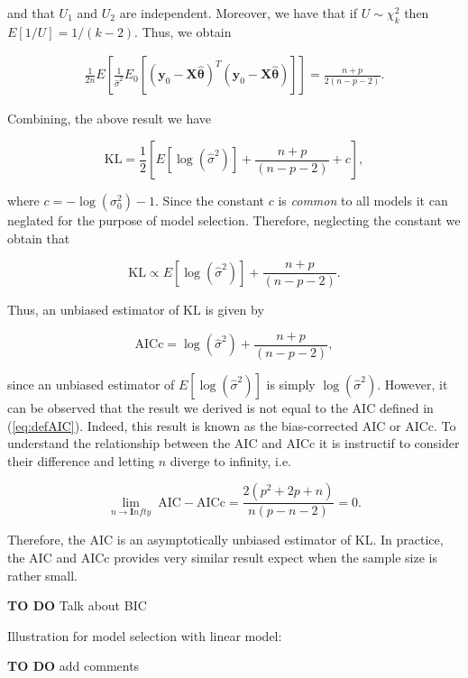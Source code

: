 \documentclass[]{book}
\theoremstyle{definition}
\theoremstyle{definition}
\theoremstyle{definition}
\theoremstyle{remark}
\begin{document}
{and that \(U_1\) and \(U_2\) are independent. Moreover, we have that if
\(U \sim \chi^2_k\) then \(E[1/U] = 1/(k-2)\). Thus, we obtain

\[\begin{aligned}
\frac{1}{{2n}} {E}\left[ \frac{1}{\hat{\sigma}^2} {E_0}\left[ {{{\left( {\mathbf{y}_0 - \mathbf{X}{\hat{\boldsymbol{\theta}}}} \right)}^T}\left( {\mathbf{y}_0 - \mathbf{X}\hat{\boldsymbol{\theta}}} \right)} \right]\right]
   = \frac{n+p}{{2(n-p-2)}}.
\end{aligned}\]

Combining, the above result we have

\[\text{KL} = \frac{1}{2} \left[ E \left[ \log \left( \hat{\sigma}^2 \right) \right] + \frac{n+p}{(n-p-2)} + c \right],\]

where \(c = - \log \left( \sigma_0^2 \right) - 1\). Since the constant
\(c\) is \emph{common} to all models it can neglated for the purpose of
model selection. Therefore, neglecting the constant we obtain that

\[\text{KL} \propto E \left[ \log \left( \hat{\sigma}^2 \right) \right] + \frac{n+p}{(n-p-2)}.\]

Thus, an unbiased estimator of \(\text{KL}\) is given by

\[\text{AICc} = \log \left( \hat{\sigma}^2 \right)  + \frac{n+p}{(n-p-2)},\]

since an unbiased estimator of
\(E \left[\log \left( \hat{\sigma}^2 \right)\right]\) is simply
\(\log \left( \hat{\sigma}^2 \right)\). However, it can be observed that
the result we derived is not equal to the AIC defined in
(\eqref{eq:defAIC}). Indeed, this result is known as the bias-corrected
AIC or AICc. To understand the relationship between the AIC and AICc it
is instructif to consider their difference and letting \(n\) diverge to
infinity, i.e.

\[\lim_{n \to \mathbf{I}nfty} \; \text{AIC} - \text{AICc} = \frac{2 \left(p^2 + 2p + n\right)}{n \left(p - n - 2\right)} = 0.\]

Therefore, the AIC is an asymptotically unbiased estimator of
\(\text{KL}\). In practice, the AIC and AICc provides very similar
result expect when the sample size is rather small.

\textbf{TO DO} Talk about BIC

Illustration for model selection with linear model:

\textbf{TO DO} add comments

\hypertarget{linear-regression-with-autocorrelated-errors}{%
}}
\end{document}
